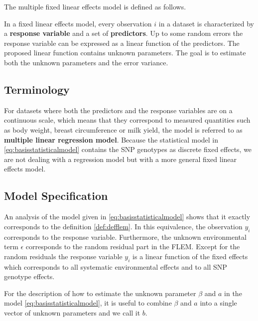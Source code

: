 \documentclass[]{book}
\theoremstyle{definition}
\theoremstyle{definition}
\theoremstyle{definition}
\theoremstyle{remark}
\let\BeginKnitrBlock\begin \let\EndKnitrBlock\end
\begin{document}
The multiple fixed linear effects model is defined as follows.

\BeginKnitrBlock{definition}[Fixed Linear Effects Model]
\protect\hypertarget{def:defflem}{}{\label{def:defflem} {} }In a fixed linear effects model, every observation \(i\) in a dataset is characterized by a \textbf{response variable} and a set of \textbf{predictors}. Up to some random errors the response variable can be expressed as a linear function of the predictors. The proposed linear function contains unknown parameters. The goal is to estimate both the unknown parameters and the error variance.
\EndKnitrBlock{definition}

\hypertarget{asm-flem-terminology}{%
\subsection{Terminology}\label{asm-flem-terminology}}

For datasets where both the predictors and the response variables are on a continuous scale, which means that they correspond to measured quantities such as body weight, breast circumference or milk yield, the model is referred to as \textbf{multiple linear regression model}. Because the statistical model in \eqref{eq:basisstatisticalmodel} contains the SNP genotypes as discrete fixed effects, we are not dealing with a regression model but with a more general fixed linear effects model.

\hypertarget{asm-flem-model-specification}{%
\subsection{Model Specification}\label{asm-flem-model-specification}}

An analysis of the model given in \eqref{eq:basisstatisticalmodel} shows that it exactly corresponds to the definition \ref{def:defflem}. In this equivalence, the observation \(y_i\) corresponds to the response variable. Furthermore, the unknown environmental term \(\epsilon\) corresponds to the random residual part in the FLEM. Except for the random residuals the response variable \(y_i\) is a linear function of the fixed effects which corresponds to all systematic environmental effects and to all SNP genotype effects.

For the description of how to estimate the unknown parameter \(\beta\) and \(a\) in the model \eqref{eq:basisstatisticalmodel}, it is useful to combine \(\beta\) and \(a\) into a single vector of unknown parameters and we call it \(b\).
\end{document}
